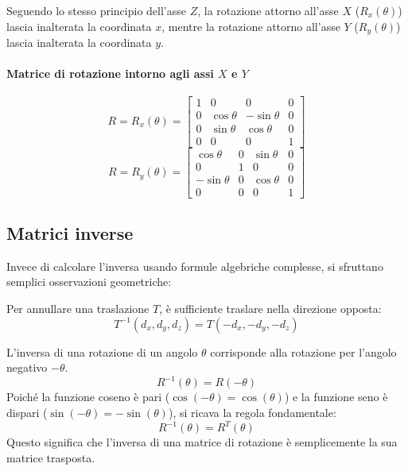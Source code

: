 \begin{theorem}
    Seguendo lo stesso principio dell'asse $ Z $, la rotazione attorno all'asse $ X $ ($R_{x}(\theta)$) lascia inalterata la coordinata $x$, mentre la rotazione attorno all'asse $Y$ ($R_y(\theta)$) lascia inalterata la coordinata $y$.
\end{theorem}
%
\paragraph{Matrice di rotazione intorno agli assi $ X $ e $ Y $}
\[
    R = R_{x}(\theta) = \begin{bmatrix}
        1 & 0           & 0             & 0 \\
        0 & \cos \theta & - \sin \theta & 0 \\
        0 & \sin \theta & \cos \theta   & 0 \\
        0 & 0           & 0             & 1
    \end{bmatrix}
\]
\[
    R = R_{y}(\theta) = \begin{bmatrix}
        \cos \theta   & 0 & \sin \theta & 0 \\
        0             & 1 & 0           & 0 \\
        - \sin \theta & 0 & \cos \theta & 0 \\
        0             & 0 & 0           & 1
    \end{bmatrix}
\]

%
\subsection{Matrici inverse}
Invece di calcolare l'inversa usando formule algebriche complesse, si sfruttano semplici osservazioni geometriche:
\begin{theorem}
    Per annullare una traslazione $T$, è sufficiente traslare nella direzione opposta:
    \[
        T^{-1}(d_x, d_y, d_z) = T(-d_x, -d_y, -d_z)
    \]
\end{theorem}
\begin{theorem}
    L'inversa di una rotazione di un angolo $\theta$ corrisponde alla rotazione per l'angolo negativo $-\theta$.
    \[
        R^{-1}(\theta) = R(-\theta)
    \]
    Poiché la funzione coseno è pari ($\cos(-\theta) = \cos(\theta)$) e la funzione seno è dispari ($\sin(-\theta) = -\sin(\theta)$), si ricava la regola fondamentale:
    \[
        R^{-1}(\theta) = R^T(\theta)
    \]
    Questo significa che l'inversa di una matrice di rotazione è semplicemente la sua matrice trasposta.
\end{theorem}

